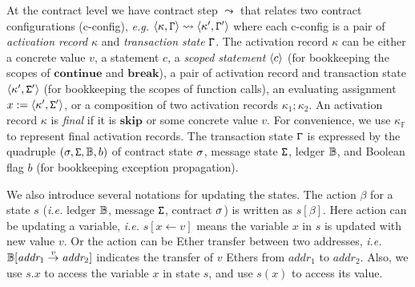 At the contract level we have contract step $\leadsto$ that relates two contract configurations (c-config), \emph{e.g.} $\langle \kappa,\mathtt{\Gamma} \rangle \leadsto \langle \kappa',\mathtt{\Gamma}' \rangle$ where each c-config is a pair of \emph{activation record} $\kappa$ and \emph{transaction state} $\mathtt{\Gamma}$. The activation record $\kappa$ can be either a concrete value $v$, a statement $c$, a \emph{scoped statement} $\langle c \rangle$ (for bookkeeping the scopes of $\textbf{continue}$ and $\textbf{break}$), a pair of activation record and transaction state $\langle \kappa',\mathtt{\Sigma}' \rangle$ (for bookkeeping the scopes of function calls), an evaluating assignment $x:= \langle \kappa',\mathtt{\Sigma}' \rangle$, or a composition of two activation records $\kappa_1;\kappa_2$. An activation record $\kappa$ is \emph{final} if it is $\textbf{skip}$ or some concrete value $v$. For convenience, we use $\kappa_{\mathbb{F}}$ to represent final activation records. The transaction state $\mathtt{\Gamma}$ is expressed by the quadruple $(\sigma,\mathtt{\Sigma},\mathbb{B},b)$ of contract state $\sigma$, message state $\mathtt{\Sigma}$, ledger $\mathbb{B}$, and Boolean flag $b$ (for bookkeeping exception propagation).


We also introduce several notations for updating the states. The action $\beta$ for a state $s$ (\emph{i.e.} ledger $\mathbb{B}$, message $\mathtt{\Sigma}$, contract $\sigma$) is written as $s[\beta]$. Here action can be updating a variable, \emph{i.e.} $s[x \leftarrow v]$ means the variable $x$ in $s$ is updated with new value $v$. Or the action can be Ether transfer between two addresses, \emph{i.e.} $\mathbb{B}[\textit{addr}_1 \stackrel{v}{\rightarrow} \textit{addr}_2]$ indicates the transfer of $v$ Ethers from $\textit{addr}_1$ to $\textit{addr}_2$. Also, we use $s.x$ to access the variable $x$ in state $s$, and use $s(x)$ to access its value.

